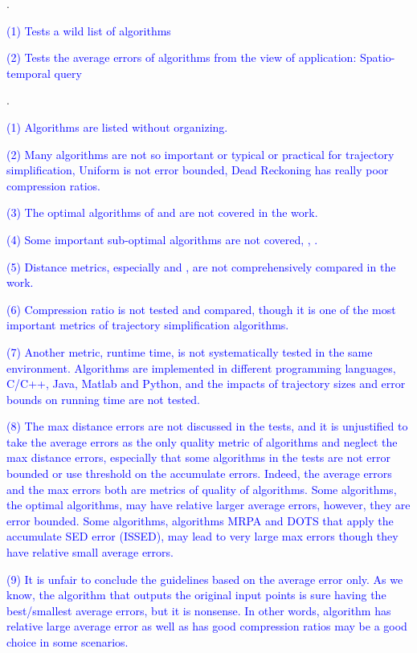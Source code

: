 {%
.

\textcolor{blue}{(1) Tests a wild list of algorithms}

\textcolor{blue}{(2) Tests the average errors of algorithms from the view of application: Spatio-temporal query}

.

\textcolor{blue}{(1) Algorithms are listed without organizing.}

\textcolor{blue}{(2) Many algorithms are not so important or typical or practical for trajectory simplification, \eg Uniform is not error bounded, Dead Reckoning has really poor compression ratios.}

\textcolor{blue}{(3) The optimal algorithms of \ped and \sed are not covered in the work.}

\textcolor{blue}{(4) Some important sub-optimal algorithms are not covered, \eg \sleeve, \cised.}

\textcolor{blue}{(5) Distance metrics, especially \ped and \sed, are not comprehensively compared in the work.}

\textcolor{blue}{(6) Compression ratio is not tested and compared, though it is one of the most important metrics of trajectory simplification algorithms.}

\textcolor{blue}{(7) Another metric, runtime time, is not systematically tested in the same environment. Algorithms are implemented in different programming languages, \ie C/C++, Java, Matlab and Python, and the impacts of trajectory sizes and error bounds on running time are not tested.}

\textcolor{blue}{(8) The max distance errors are not discussed in the tests, and it is unjustified to take the average errors as the only quality metric of algorithms and neglect the max distance errors, especially that some algorithms in the tests are not error bounded or use threshold on the accumulate errors.
Indeed, the average errors and the max errors both are metrics of quality of algorithms. Some algorithms, \eg the optimal algorithms, may have relative larger average errors, however, they are error bounded. Some algorithms, \eg algorithms MRPA and DOTS that apply the accumulate SED error (ISSED), may lead to very large max errors though they have relative small average errors.}

\textcolor{blue}{(9) It is unfair to conclude the guidelines based on the average error only. As we know, the algorithm that outputs the original input points is sure having the best/smallest average errors, but it is nonsense. In other words, algorithm has relative large average error as well as has good compression ratios may be a good choice in some scenarios.}
 }%



